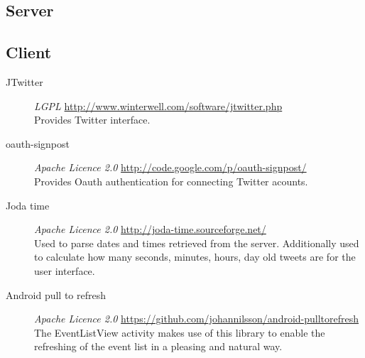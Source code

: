 \subsection{Server}


\subsection{Client}

\begin{description}
    \item[JTwitter] \emph{LGPL} \url{http://www.winterwell.com/software/jtwitter.php} \hfill \\
        Provides Twitter interface.
    \item[oauth-signpost] \emph{Apache Licence 2.0} \url{http://code.google.com/p/oauth-signpost/} \hfill \\
        Provides Oauth authentication for connecting Twitter acounts.
    \item[Joda time] \emph{Apache Licence 2.0} \url{http://joda-time.sourceforge.net/} \hfill \\
        Used to parse dates and times retrieved from the server. Additionally
        used to calculate how many seconds, minutes, hours, day old tweets are
        for the user interface.
    \item[Android pull to refresh] \emph{Apache Licence 2.0} \url{https://github.com/johannilsson/android-pulltorefresh} \hfill \\
        The EventListView activity makes use of this library to enable the
        refreshing of the event list in a pleasing and natural way.
\end{description}
